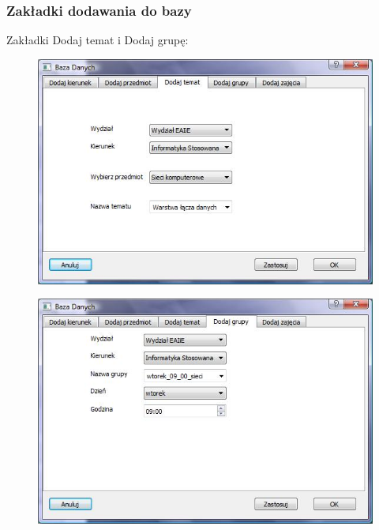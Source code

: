 \documentclass{beamer}
\begin{document}
\begin{frame}
\frametitle{Zakładki dodawania do bazy}

Zakładki Dodaj temat i Dodaj grupę:
\begin{figure}
\includegraphics{dodaj_temat.jpg}
\end{figure}
\begin{figure}
\includegraphics{dodaj_grupe.jpg}
\end{figure}
\end{frame}
\end{document}
